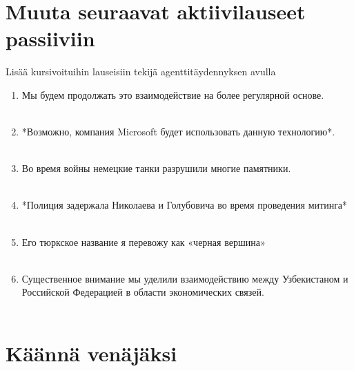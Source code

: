\documentclass[paper=a4, fontsize=11pt]{scrartcl}
\begin{document}
\section{Muuta seuraavat aktiivilauseet passiiviin}

Lisää kursivoituihin lauseisiin tekijä agenttitäydennyksen avulla

\begin{enumerate}
    \item Мы будем продолжать это взаимодействие на более регулярной основе. \\
            \underline{\hspace{14cm}} \\
    \item *Возможно, компания Microsoft будет использовать данную технологию*. \\
            \underline{\hspace{14cm}} \\
    \item Во время войны немецкие танки разрушили многие памятники. \\
            \underline{\hspace{14cm}} \\
    \item *Полиция задержала Николаева и Голубовича во время проведения митинга* \\
            \underline{\hspace{14cm}} \\
    \item Его тюркское название я перевожу как «черная вершина» \\
            \underline{\hspace{14cm}} \\
    \item  Существенное внимание мы уделили взаимодействию между Узбекистаном и Российской Федерацией в области экономических связей. \\
            \underline{\hspace{14cm}} \\
\end{enumerate}

\section{Käännä venäjäksi}
\end{document}
